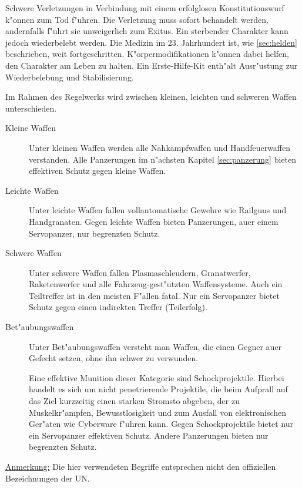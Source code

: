Schwere Verletzungen in Verbindung mit einem erfolglosen Konstitutionswurf k"onnen zum Tod f"uhren. Die Verletzung muss sofort behandelt werden, andernfalls f"uhrt sie unweigerlich zum Exitus. Ein sterbender Charakter kann jedoch wiederbelebt werden. Die Medizin im 23. Jahrhundert ist, wie \cref{sec:helden} beschrieben, weit fortgeschritten. K"orpermodifikationen k"onnen dabei helfen, den Charakter am Leben zu halten. Ein Erste-Hilfe-Kit enth"alt Ausr"ustung zur Wiederbelebung und Stabilisierung.


Im Rahmen des Regelwerks wird zwischen kleinen, leichten und schweren Waffen unterschieden.

\begin{description}
    \item [Kleine Waffen] Unter kleinen Waffen werden alle Nahkampfwaffen und Handfeuerwaffen verstanden. Alle Panzerungen im n"achsten 
        Kapitel \cref{sec:panzerung} bieten effektiven Schutz gegen kleine Waffen.
    \item[Leichte Waffen] Unter leichte Waffen fallen vollautomatische Gewehre wie Railguns und Handgranaten. Gegen leichte Waffen bieten 
        Panzerungen, au\3er einem Servopanzer, nur begrenzten Schutz.
    \item[Schwere Waffen] Unter schwere Waffen fallen Plasmaschleudern, Granatwerfer, Raketenwerfer und alle Fahrzeug-gest"utzten 
        Waffensysteme. Auch ein Teiltreffer ist in den meisten F"allen fatal. Nur ein Servopanzer bietet Schutz gegen einen indirekten Treffer (Teilerfolg).
    \item[Bet"aubungswaffen] Unter Bet"aubungswaffen versteht man Waffen, die einen Gegner au\3er Gefecht setzen, ohne ihn schwer zu 
        verwunden.
        
        Eine effektive Munition dieser Kategorie sind Schockprojektile. Hierbei handelt es sich um nicht penetrierende Projektile, die beim Aufprall auf das Ziel kurzzeitig einen starken Stromsto\3 abgeben, der zu Muskelkr"ampfen, Bewusstlosigkeit und zum Ausfall von elektronischen Ger"aten wie Cyberware f"uhren kann. Gegen Schockprojektile bietet nur ein Servopanzer effektiven Schutz. Andere Panzerungen bieten nur begrenzten Schutz.
\end{description}

\underline{Anmerkung:} Die hier verwendeten Begriffe entsprechen nicht den offiziellen Bezeichnungen der UN.

